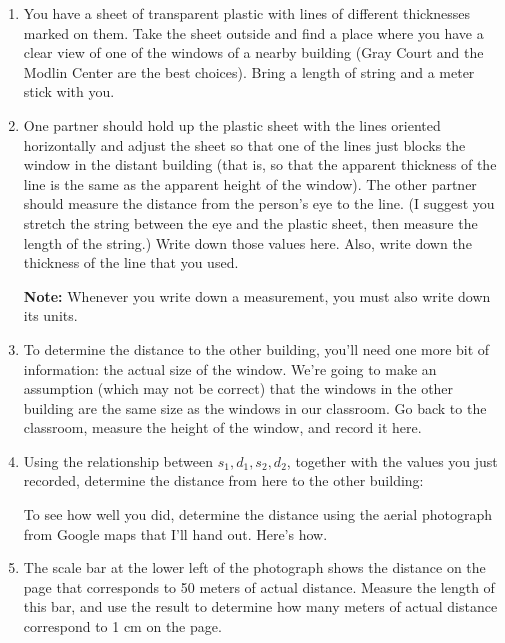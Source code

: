 \begin{enumerate}

\item You have a sheet of transparent plastic with lines of different
thicknesses marked on them.  Take the sheet outside and find a place
where you have a clear view of one of the windows of a nearby 
building (Gray Court and the Modlin Center are the best choices).  Bring
a length of string and a meter stick with you.

\item One partner should hold up the plastic sheet with the lines
oriented horizontally and adjust the sheet so that one of the lines just
blocks the window in the distant
building (that is, so that the apparent thickness
of the line is the same as the apparent height of the window).
The other partner should measure the distance from the person's eye to
the line.  (I suggest you stretch the string between the eye and
the plastic sheet, then measure the length of the string.)
Write down those values here.  Also, write down the thickness of the
line that you used.

{\bf Note:} Whenever you write down a measurement,
you must also write down its units.

\answerspace{1in}

\pagebreak[2]
\item To determine the distance to the other building, you'll need one more bit
of information: the actual size of the window.  We're going to make
an assumption (which may not be correct) that the windows in the other
building
are the same size as the windows in our classroom.  Go back
to the classroom, measure the height of the window, and record it here.

\answerspace{1in}

\item Using the relationship between $s_1,d_1,s_2,d_2$, together
with the values you just recorded, determine the distance
from here to the other building:

\answerspace{1in}

To see how well you did, determine the distance using
the aerial photograph from Google maps that I'll hand out. Here's how.

\item The scale bar at the lower left of the photograph
shows the distance on the page that corresponds to 50 meters of
actual distance. Measure the length of this bar, and use the result
to determine how many meters of actual distance correspond to 1 cm
on the page.


\end{enumerate}

